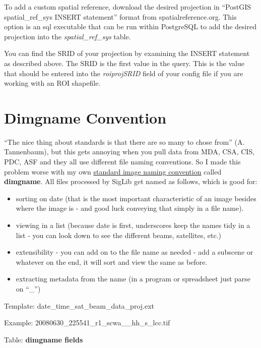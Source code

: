 \documentclass[letterpaper,10pt,openany,oneside]{sphinxmanual}
\begin{document}
To add a custom spatial reference, download the desired projection in
``PostGIS spatial\_ref\_sys INSERT statement'' format from
spatialreference.org. This option is an sql executable that can be run
within PostgreSQL to add the desired projection into the
\emph{spatial\_ref\_sys} table.

You can find the SRID of your projection by examining the INSERT
statement as described above. The SRID is the first value in the query.
This is the value that should be entered into the \emph{roiprojSRID} field of
your config file if you are working with an ROI shapefile.


\chapter{Dimgname Convention}
\label{wiki:dimgname-convention}
``The nice thing about standards is that there are so many to chose from''
(A. Tannenbaum), but this gets annoying when you pull data from MDA,
CSA, CIS, PDC, ASF and they all use different file naming conventions.
So I made this problem worse with my own \href{https://xkcd.com/927/}{standard image naming
convention} called \textbf{dimgname}. All files
processed by SigLib get named as follows, which is good for:
\begin{itemize}
\item {} 
sorting on date (that is the most important characteristic of an
image besides where the image is - and good luck conveying that
simply in a file name).

\item {} 
viewing in a list (because date is first, underscores keep the names
tidy in a list - you can look down to see the different beams,
satellites, etc.)

\item {} 
extensibility - you can add on to the file name as needed - add a
subscene or whatever on the end, it will sort and view the same as
before.

\item {} 
extracting metadata from the name (in a program or spreadsheet just
parse on ``\_'')

\end{itemize}

Template: date\_time\_sat\_beam\_data\_proj.ext

Example: 20080630\_225541\_r1\_scwa\_\_hh\_s\_lcc.tif

Table: \textbf{dimgname fields}
\end{document}
